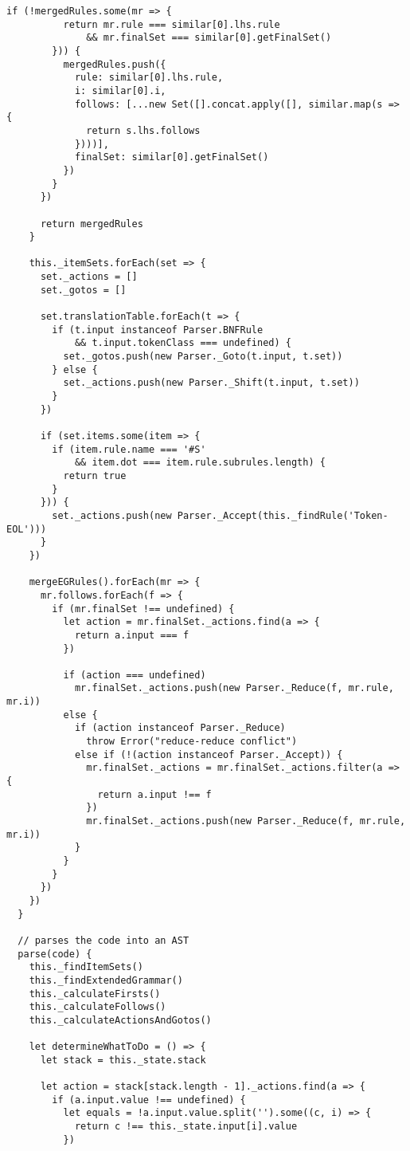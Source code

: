 \begin{lstlisting}[frame=single]
        if (!mergedRules.some(mr => {
          return mr.rule === similar[0].lhs.rule 
              && mr.finalSet === similar[0].getFinalSet()
        })) {
          mergedRules.push({
            rule: similar[0].lhs.rule,
            i: similar[0].i,
            follows: [...new Set([].concat.apply([], similar.map(s => { 
              return s.lhs.follows 
            })))],
            finalSet: similar[0].getFinalSet()
          })
        }
      })
      
      return mergedRules
    }
    
    this._itemSets.forEach(set => {
      set._actions = []
      set._gotos = []
      
      set.translationTable.forEach(t => { 
        if (t.input instanceof Parser.BNFRule 
            && t.input.tokenClass === undefined) {
          set._gotos.push(new Parser._Goto(t.input, t.set))
        } else {
          set._actions.push(new Parser._Shift(t.input, t.set))
        }
      })
      
      if (set.items.some(item => {
        if (item.rule.name === '#S'
            && item.dot === item.rule.subrules.length) {
          return true
        }
      })) {
        set._actions.push(new Parser._Accept(this._findRule('Token-EOL')))
      }
    })
    
    mergeEGRules().forEach(mr => {
      mr.follows.forEach(f => {
        if (mr.finalSet !== undefined) {
          let action = mr.finalSet._actions.find(a => {
            return a.input === f
          })
          
          if (action === undefined)
            mr.finalSet._actions.push(new Parser._Reduce(f, mr.rule, mr.i))
          else {
            if (action instanceof Parser._Reduce) 
              throw Error("reduce-reduce conflict")
            else if (!(action instanceof Parser._Accept)) {
              mr.finalSet._actions = mr.finalSet._actions.filter(a => {
                return a.input !== f
              })
              mr.finalSet._actions.push(new Parser._Reduce(f, mr.rule, mr.i))
            }
          }  
        }
      })
    })
  }
  
  // parses the code into an AST
  parse(code) {
    this._findItemSets()
    this._findExtendedGrammar()
    this._calculateFirsts()
    this._calculateFollows()
    this._calculateActionsAndGotos()
  
    let determineWhatToDo = () => {
      let stack = this._state.stack
      
      let action = stack[stack.length - 1]._actions.find(a => {
        if (a.input.value !== undefined) {
          let equals = !a.input.value.split('').some((c, i) => {
            return c !== this._state.input[i].value
          })
          

\end{lstlisting}
